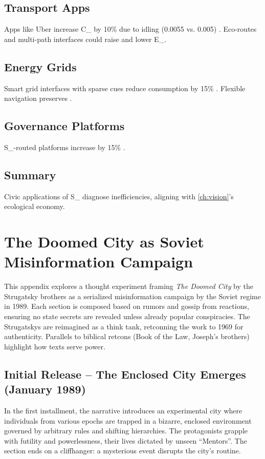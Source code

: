 \documentclass[openany]{book}
\newcommand{\Eint}{E_{\mathrm{int}}} %
\newcommand{\Cfoot}{C_{\mathrm{foot}}} %
\newcommand{\Auton}{\mathcal{A}} %
\newcommand{\SUX}{S_{\mathrm{UX}}} %
\begin{document}
\section{Transport Apps}
\label{sec:civic-transport}
Apps like Uber increase \Cfoot{} by 10\% due to idling (\SI{0.0055}{\kgCOe} vs. \SI{0.005}{\kgCOe}) \citep{colak2024}. Eco-routes and multi-path interfaces could raise \Auton{} and lower \Eint{}.

\section{Energy Grids}
\label{sec:civic-energy}
Smart grid interfaces with sparse cues reduce consumption by 15\% \citep{extentia2024}. Flexible navigation preserves \Auton{}.

\section{Governance Platforms}
\label{sec:civic-governance}
\SUX{}-routed platforms increase \Auton{} by 15\% \citep{doctorow2022}.

\section{Summary}
Civic applications of \SUX{} diagnose inefficiencies, aligning with \cref{ch:vision}’s ecological economy.

\chapter{The Doomed City as Soviet Misinformation Campaign}
\label{app:doomed-city}

This appendix explores a thought experiment framing \emph{The Doomed City} by the Strugatsky brothers as a serialized misinformation campaign by the Soviet regime in 1989. Each section is composed based on rumors and gossip from reactions, ensuring no state secrets are revealed unless already popular conspiracies. The Strugatskys are reimagined as a think tank, retconning the work to 1969 for authenticity. Parallels to biblical retcons (Book of the Law, Joseph's brothers) highlight how texts serve power.

\section{Initial Release – The Enclosed City Emerges (January 1989)}
In the first installment, the narrative introduces an experimental city where individuals from various epochs are trapped in a bizarre, enclosed environment governed by arbitrary rules and shifting hierarchies. The protagonists grapple with futility and powerlessness, their lives dictated by unseen \textquotedblleft Mentors\textquotedblright. The section ends on a cliffhanger: a mysterious event disrupts the city's routine.
\end{document}
